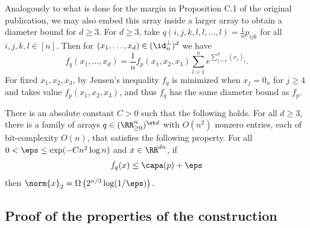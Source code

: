 Analogously to what is done for the margin in Proposition C.1 of the original publication, we may also embed this array inside a larger array to obtain a diameter bound for $d \geq 3$. For $d \geq 3$, take $q(i,j,k,l,l,\dots, l) = \frac{1}{n} p_{ijk}$ for all $i,j,k,l \in [n]$. Then for $(x_1, \dots, x_d) \in (\id_n^\perp)^d$ we have 
$$f_q(x_1, \dots, x_d) = \frac{1}{n} f_p(x_1,x_2,x_3)  \sum_{l = 1}^n e^{\sum_{j = 4}^d (x_j)_l}.$$
For fixed $x_1, x_2, x_3$, by Jensen's inequality $f_q$ is minimized when $x_j = 0_n$ for $j \geq 4$ and takes value $f_p(x_1, x_2, x_3)$, and thus $f_q$ has the same diameter bound as $f_p$. 


\begin{cor}\label{cor:diameter-d}
There is an absolute constant $C > 0$ such that the following holds. For all $d \geq 3$, there is a family of arrays $q \in (\RR_{\geq 0}^n)^{\ot d}$ with $O(n^2)$ nonzero entries, each of bit-complexity $O(n)$, that satisfies the following property. For all $0 <\eps \leq  \exp(- C n^2 \log n)$ and $x \in \RR^{dn}$, if
	$$f_q (x) \leq \capa(p) + \eps$$
	then $\norm{x}_2 = \Omega\left(2^{n/3}\log(1/\eps)\right).$

\end{cor}



\subsection{Proof of the properties of the construction}

